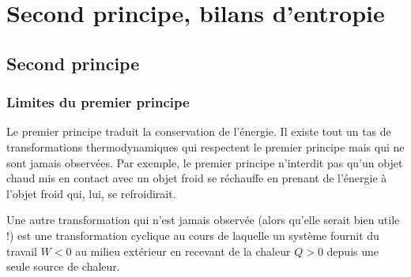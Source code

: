 \documentclass{cours}
\begin{document}
\setcounter{chapter}{18}
\chapter{Second principe, bilans d'entropie}
\section{Second principe}%
\label{sec:second_principe}

\subsection{Limites du premier principe}%
\label{sub:limites_du_premier_principe}

Le premier principe traduit la conservation de l'énergie. Il existe tout un tas de transformations thermodynamiques qui respectent le premier principe mais qui ne sont jamais observées. Par exemple, le premier principe n'interdit pas qu'un objet chaud mis en contact avec un objet froid se réchauffe en prenant de l'énergie à l'objet froid qui, lui, se refroidirait.

\begin{center}
\end{center}

Une autre transformation qui n'est jamais observée (alors qu'elle serait bien utile !) est une transformation cyclique au cours de laquelle un système fournit du travail $W<0$ au milieu extérieur en recevant de la chaleur $Q>0$ depuis une seule source de chaleur.
\end{document}
